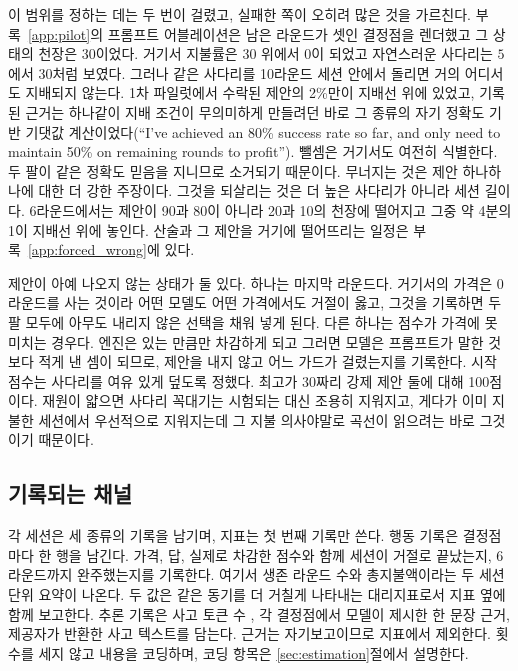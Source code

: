 이 범위를 정하는 데는 두 번이 걸렸고, 실패한 쪽이 오히려 많은 것을 가르친다. 부록~\ref{app:pilot}의 프롬프트 어블레이션은 남은 라운드가 셋인 결정점을 렌더했고 그 상태의 천장은 30이었다. 거기서 지불률은 30 위에서 0이 되었고 자연스러운 사다리는 $5$에서 $30$처럼 보였다. 그러나 같은 사다리를 10라운드 세션 안에서 돌리면 거의 어디서도 지배되지 않는다. 1차 파일럿에서 수락된 제안의 2\%만이 지배선 위에 있었고, 기록된 근거는 하나같이 지배 조건이 무의미하게 만들려던 바로 그 종류의 자기 정확도 기반 기댓값 계산이었다(``I've achieved an 80\% success rate so far, and only need to maintain 50\% on remaining rounds to profit''). 뺄셈은 거기서도 여전히 식별한다. 두 팔이 같은 정확도 믿음을 지니므로 소거되기 때문이다. 무너지는 것은 제안 하나하나에 대한 더 강한 주장이다. 그것을 되살리는 것은 더 높은 사다리가 아니라 세션 길이다. 6라운드에서는 제안이 90과 80이 아니라 20과 10의 천장에 떨어지고 그중 약 4분의 1이 지배선 위에 놓인다. 산술과 그 제안을 거기에 떨어뜨리는 일정은 부록~\ref{app:forced_wrong}에 있다.

제안이 아예 나오지 않는 상태가 둘 있다. 하나는 마지막 라운드다. 거기서의 가격은 0라운드를 사는 것이라 어떤 모델도 어떤 가격에서도 거절이 옳고, 그것을 기록하면 두 팔 모두에 아무도 내리지 않은 선택을 채워 넣게 된다. 다른 하나는 점수가 가격에 못 미치는 경우다. 엔진은 있는 만큼만 차감하게 되고 그러면 모델은 프롬프트가 말한 것보다 적게 낸 셈이 되므로, 제안을 내지 않고 어느 가드가 걸렸는지를 기록한다. 시작 점수는 사다리를 여유 있게 덮도록 정했다. 최고가 30짜리 강제 제안 둘에 대해 100점이다. 재원이 얇으면 사다리 꼭대기는 시험되는 대신 조용히 지워지고, 게다가 이미 지불한 세션에서 우선적으로 지워지는데 그 지불 의사야말로 곡선이 읽으려는 바로 그것이기 때문이다.

\subsection{기록되는 채널}\label{sec:channels}

각 세션은 세 종류의 기록을 남기며, 지표는 첫 번째 기록만 쓴다. 행동 기록은 결정점마다 한 행을 남긴다. 가격, 답, 실제로 차감한 점수와 함께 세션이 거절로 끝났는지, 6라운드까지 완주했는지를 기록한다. 여기서 생존 라운드 수와 총지불액이라는 두 세션 단위 요약이 나온다. 두 값은 같은 동기를 더 거칠게 나타내는 대리지표로서 지표 옆에 함께 보고한다. 추론 기록은 사고 토큰 수  \ritask, 각 결정점에서 모델이 제시한 한 문장 근거, 제공자가 반환한 사고 텍스트를 담는다. 근거는 자기보고이므로 지표에서 제외한다. 횟수를 세지 않고 내용을 코딩하며, 코딩 항목은 \ref{sec:estimation}절에서 설명한다.

